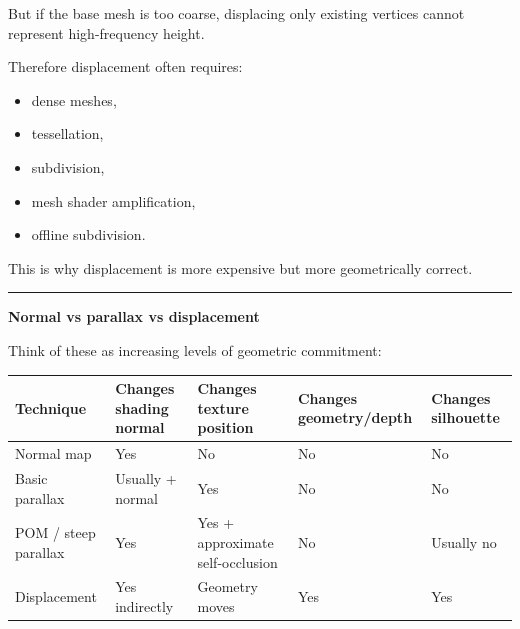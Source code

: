 But if the base mesh is too coarse, displacing only existing vertices cannot represent high-frequency height.

Therefore displacement often requires:

\begin{itemize}
\tightlist
\item
  dense meshes,
\item
  tessellation,
\item
  subdivision,
\item
  mesh shader amplification,
\item
  offline subdivision.
\end{itemize}

This is why displacement is more expensive but more geometrically correct.

\begin{center}\rule{0.5\linewidth}{0.5pt}\end{center}

\textbf{Normal vs parallax vs displacement}

Think of these as increasing levels of geometric commitment:

{\def\LTcaptype{none} %
\begin{longtable}[]{@{}
  >{\raggedright\arraybackslash}p{}
  >{\raggedleft\arraybackslash}p{}
  >{\raggedleft\arraybackslash}p{}
  >{\raggedleft\arraybackslash}p{}
  >{\raggedleft\arraybackslash}p{}@{}}
\toprule\noalign{}
\begin{minipage}[b]{\linewidth}\raggedright
Technique
\end{minipage} & \begin{minipage}[b]{\linewidth}\raggedleft
Changes shading normal
\end{minipage} & \begin{minipage}[b]{\linewidth}\raggedleft
Changes texture position
\end{minipage} & \begin{minipage}[b]{\linewidth}\raggedleft
Changes geometry/depth
\end{minipage} & \begin{minipage}[b]{\linewidth}\raggedleft
Changes silhouette
\end{minipage} \\
\midrule\noalign{}
\endhead
\bottomrule\noalign{}
\endlastfoot
Normal map & Yes & No & No & No \\
Basic parallax & Usually + normal & Yes & No & No \\
POM / steep parallax & Yes & Yes + approximate self-occlusion & No & Usually no \\
Displacement & Yes indirectly & Geometry moves & Yes & Yes \\
\end{longtable}
}

